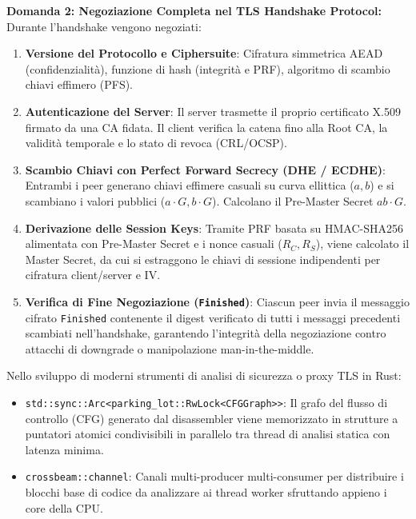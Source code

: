 \documentclass[11pt,a4paper]{article}
\begin{document}
\begin{solutionbox}
\textbf{Domanda 2: Negoziazione Completa nel TLS Handshake Protocol:}
Durante l'handshake vengono negoziati:
\begin{enumerate}
    \item \textbf{Versione del Protocollo e Ciphersuite}: Cifratura simmetrica AEAD (confidenzialit\`a), funzione di hash (integrit\`a e PRF), algoritmo di scambio chiavi effimero (PFS).
    \item \textbf{Autenticazione del Server}: Il server trasmette il proprio certificato X.509 firmato da una CA fidata. Il client verifica la catena fino alla Root CA, la validit\`a temporale e lo stato di revoca (CRL/OCSP).
    \item \textbf{Scambio Chiavi con Perfect Forward Secrecy (DHE / ECDHE)}: Entrambi i peer generano chiavi effimere casuali su curva ellittica ($a, b$) e si scambiano i valori pubblici ($a \cdot G, b \cdot G$). Calcolano il Pre-Master Secret $ab \cdot G$.
    \item \textbf{Derivazione delle Session Keys}: Tramite PRF basata su HMAC-SHA256 alimentata con Pre-Master Secret e i nonce casuali ($R_C, R_S$), viene calcolato il Master Secret, da cui si estraggono le chiavi di sessione indipendenti per cifratura client/server e IV.
    \item \textbf{Verifica di Fine Negoziazione (\texttt{Finished})}: Ciascun peer invia il messaggio cifrato \texttt{Finished} contenente il digest verificato di tutti i messaggi precedenti scambiati nell'handshake, garantendo l'integrit\`a della negoziazione contro attacchi di downgrade o manipolazione man-in-the-middle.
\end{enumerate}
\end{solutionbox}

\begin{altbox}
Nello sviluppo di moderni strumenti di analisi di sicurezza o proxy TLS in Rust:
\begin{itemize}
    \item \texttt{std::sync::Arc<parking\_lot::RwLock<CFGGraph>>}: Il grafo del flusso di controllo (CFG) generato dal disassembler viene memorizzato in strutture a puntatori atomici condivisibili in parallelo tra thread di analisi statica con latenza minima.
    \item \texttt{crossbeam::channel}: Canali multi-producer multi-consumer per distribuire i blocchi base di codice da analizzare ai thread worker sfruttando appieno i core della CPU.
\end{itemize}
\end{altbox}
\end{document}
